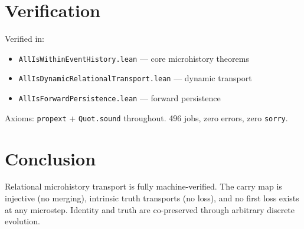 \documentclass[12pt,a4paper]{article}
\begin{document}
\section{Verification}

Verified in:
\begin{itemize}
    \item \texttt{AllIsWithinEventHistory.lean} --- core microhistory theorems
    \item \texttt{AllIsDynamicRelationalTransport.lean} --- dynamic transport
    \item \texttt{AllIsForwardPersistence.lean} --- forward persistence
\end{itemize}

Axioms: \texttt{propext} + \texttt{Quot.sound} throughout.
496 jobs, zero errors, zero \texttt{sorry}.

\section{Conclusion}

Relational microhistory transport is fully machine-verified. The carry map
is injective (no merging), intrinsic truth transports (no loss), and no
first loss exists at any microstep. Identity and truth are co-preserved
through arbitrary discrete evolution.
\end{document}
